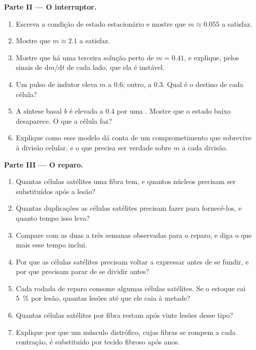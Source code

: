 \begin{problem}
\medskip
\noindent\textbf{Parte II --- O interruptor.}
\begin{enumerate}[resume]
  \item Escreva a condição de estado estacionário e mostre que
        $m \approx
        0.055$ a satisfaz.
  \item Mostre que $m \approx 2.1$ a satisfaz.
  \item Mostre que há uma terceira solução perto de $m = 0.41$, e
        explique, pelos sinais de $\mathrm{d}m/\mathrm{d}t$ de cada lado,
        que ela é instável.
  \item Um pulso de indutor eleva $m$ a $0.6$; outro, a $0.3$. Qual é o
        destino de cada célula?
  \item A síntese basal $b$ é elevada a $0.4$ por uma . Mostre
        que o estado baixo desaparece. O que a célula faz?
  \item Explique como esse modelo dá conta de um comprometimento que
        sobrevive à divisão celular, e o que precisa ser verdade sobre
        $m$ a cada divisão.
\end{enumerate}

\medskip
\noindent\textbf{Parte III --- O reparo.}
\begin{enumerate}[resume]
  \item Quantas células satélites uma fibra tem, e quantos núcleos
        precisam ser substituídos após a lesão?
  \item Quantas duplicações as células satélites precisam fazer para
        fornecê-los, e quanto tempo isso leva?
  \item Compare com as duas a três semanas observadas para o reparo, e
        diga o que mais esse tempo inclui.
  \item Por que as células satélites precisam voltar a expressar 
        antes de se fundir, e por que precisam parar de se dividir
        antes?
  \item Cada rodada de reparo consome algumas células satélites. Se o
        estoque cai \qty{5}{\%} por lesão, quantas lesões até que ele
        caia à metade?
  \item Quantas células satélites por fibra restam após vinte lesões
        desse tipo?
  \item Explique por que um músculo distrófico, cujas fibras se rompem
        a cada contração, é substituído por tecido fibroso após anos.
\end{enumerate}


\end{problem}
